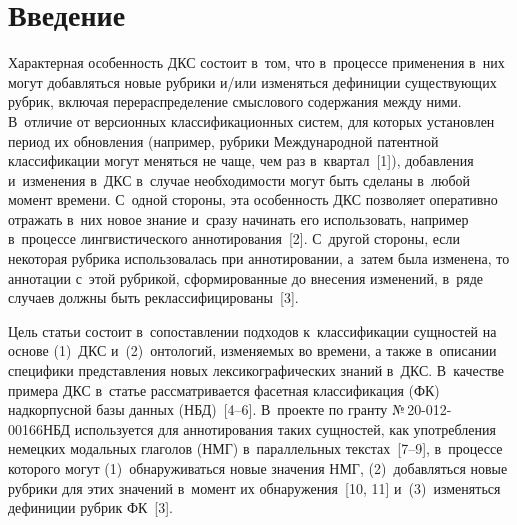 



\thispagestyle{headings}

\begin{multicols}{2}

\label{st\stat}
     
\section{Введение}

Характерная особенность ДКС 
состоит в~том, что в~процессе применения в~них могут добавляться новые 
рубрики и/или изменяться дефиниции существующих рубрик, включая 
перераспределение смыслового содержания между ними. В~отличие от 
версионных классификационных систем, для которых установлен период их 
обновления (например, рубрики Международной патентной классификации 
могут меняться не чаще, чем раз в~квартал~[1]), добавления и~изменения 
в~ДКС в~случае необходимости могут быть сделаны в~любой момент 
времени. С~одной стороны, эта особенность ДКС позволяет оперативно 
отражать в~них новое знание и~сразу начинать его использовать, например 
в~процессе лингвистического аннотирования~[2]. С~другой стороны, если 
некоторая рубрика использовалась при аннотировании, а~затем была 
изменена, то аннотации с~этой рубрикой, сформированные до внесения 
изменений, в~ряде случаев должны быть реклассифицированы~[3].

Цель статьи состоит в~сопоставлении подходов к~классификации сущностей 
на основе (1)~ДКС и~(2)~онтологий, изменяемых во времени, а также 
в~описании специфики представления новых лексикографических знаний 
в~ДКС. В~качестве примера ДКС в~статье рассматривается фасетная 
классификация (ФК) надкорпусной базы данных (НБД)~[4--6]. В~проекте по 
гранту №\,20-012-00166\linebreak НБД используется для аннотирования таких 
сущностей, как употребления немецких модальных глаго\-лов (НМГ) 
в~параллельных текстах~[7--9], в~процессе которого могут 
(1)~обнаруживаться новые значения НМГ, (2)~добавляться новые рубрики 
для этих значений в~момент их обнаружения~[10, 11] и~(3)~изменяться 
дефиниции рубрик ФК~[3].

\vspace*{-14pt}


\end{multicols}
